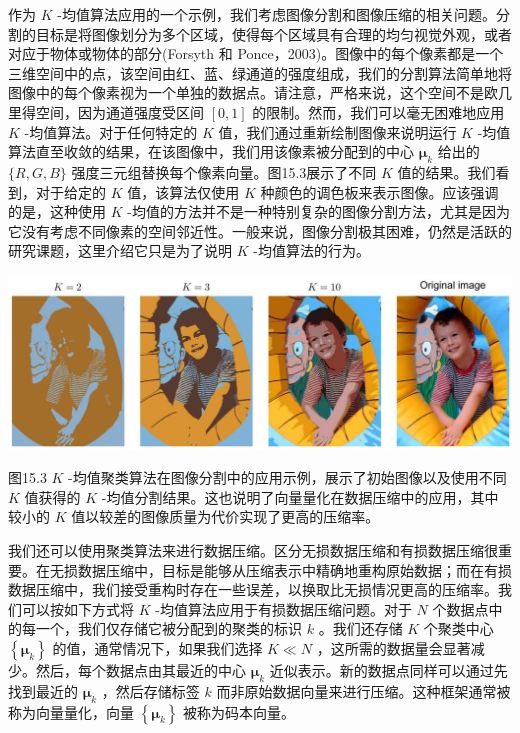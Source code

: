\documentclass[10pt]{article}
\begin{document}
作为 \(K\) -均值算法应用的一个示例，我们考虑图像分割和图像压缩的相关问题。分割的目标是将图像划分为多个区域，使得每个区域具有合理的均匀视觉外观，或者对应于物体或物体的部分(Forsyth 和 Ponce，2003)。图像中的每个像素都是一个三维空间中的点，该空间由红、蓝、绿通道的强度组成，我们的分割算法简单地将图像中的每个像素视为一个单独的数据点。请注意，严格来说，这个空间不是欧几里得空间，因为通道强度受区间 \(\left\lbrack  {0,1}\right\rbrack\) 的限制。然而，我们可以毫无困难地应用 \(K\) -均值算法。对于任何特定的 \(K\) 值，我们通过重新绘制图像来说明运行 \(K\) -均值算法直至收敛的结果，在该图像中，我们用该像素被分配到的中心 \({\mathbf{\mu }}_{k}\) 给出的 \(\{ R,G,B\}\) 强度三元组替换每个像素向量。图15.3展示了不同 \(K\) 值的结果。我们看到，对于给定的 \(K\) 值，该算法仅使用 \(K\) 种颜色的调色板来表示图像。应该强调的是，这种使用 \(K\) -均值的方法并不是一种特别复杂的图像分割方法，尤其是因为它没有考虑不同像素的空间邻近性。一般来说，图像分割极其困难，仍然是活跃的研究课题，这里介绍它只是为了说明 \(K\) -均值算法的行为。

\begin{center}
\includegraphics[max width=1.0\textwidth]{images/0194e279-9b28-703a-88f4-c3ac21e2010d_484_202_342_1346_467_0.jpg}
\end{center}
\hspace*{3em} 

图15.3 \(K\) -均值聚类算法在图像分割中的应用示例，展示了初始图像以及使用不同 \(K\) 值获得的 \(K\) -均值分割结果。这也说明了向量量化在数据压缩中的应用，其中较小的 \(K\) 值以较差的图像质量为代价实现了更高的压缩率。

我们还可以使用聚类算法来进行数据压缩。区分无损数据压缩和有损数据压缩很重要。在无损数据压缩中，目标是能够从压缩表示中精确地重构原始数据；而在有损数据压缩中，我们接受重构时存在一些误差，以换取比无损情况更高的压缩率。我们可以按如下方式将 \(K\) -均值算法应用于有损数据压缩问题。对于 \(N\) 个数据点中的每一个，我们仅存储它被分配到的聚类的标识 \(k\) 。我们还存储 \(K\) 个聚类中心 \(\left\{  {\mathbf{\mu }}_{k}\right\}\) 的值，通常情况下，如果我们选择 \(K \ll  N\) ，这所需的数据量会显著减少。然后，每个数据点由其最近的中心 \({\mathbf{\mu }}_{k}\) 近似表示。新的数据点同样可以通过先找到最近的 \({\mathbf{\mu }}_{k}\) ，然后存储标签 \(k\) 而非原始数据向量来进行压缩。这种框架通常被称为向量量化，向量 \(\left\{  {\mathbf{\mu }}_{k}\right\}\) 被称为码本向量。
\end{document}

